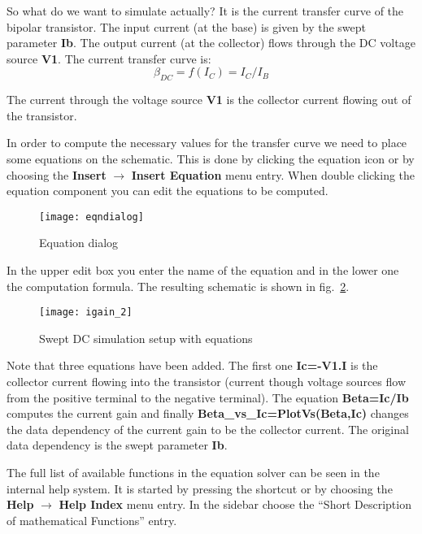 \medskip

So what do we want to simulate actually?  It is the current transfer
curve of the bipolar transistor.  The input current (at the base) is
given by the swept parameter \textbf{Ib}.  The output current (at the
collector) flows through the DC voltage source \textbf{V1}.  The
current transfer curve is:
\begin{equation*}
\beta_{DC} = f\left(I_C\right) = I_C / I_B
\end{equation*}

The current through the voltage source \textbf{V1} is the collector
current flowing out of the transistor.


In order to compute the necessary values for the transfer curve we
need to place some equations on the schematic.  This is done by
clicking the equation icon or by choosing the \textbf{Insert}
$\rightarrow$ \textbf{Insert Equation} menu entry.  When double
clicking the equation component you can edit the equations to be
computed.

\begin{figure}[ht]
  \centering
  \texttt{[image: eqndialog]}
  \caption{Equation dialog}
  \label{fig:eqndialog}
\end{figure}
\FloatBarrier

In the upper edit box you enter the name of the equation and in the
lower one the computation formula.  The resulting schematic is shown
in fig.~\ref{fig:igain_2}.

\begin{figure}[ht]
  \centering
  \texttt{[image: igain\_2]}
  \caption{Swept DC simulation setup with equations}
  \label{fig:igain_2}
\end{figure}
\FloatBarrier

Note that three equations have been added.  The first one
\textbf{Ic=-V1.I} is the collector current flowing into the transistor
(current though voltage sources flow from the positive terminal to the
negative terminal).  The equation \textbf{Beta=Ic/Ib} computes the
current gain and finally \textbf{Beta\_vs\_Ic=PlotVs(Beta,Ic)} changes
the data dependency of the current gain to be the collector current.
The original data dependency is the swept parameter \textbf{Ib}.


The full list of available functions in the equation solver can be
seen in the internal help system.  It is started by pressing the
 shortcut or by choosing the \textbf{Help} $\rightarrow$
\textbf{Help Index} menu entry.  In the sidebar choose the ``Short
Description of mathematical Functions'' entry.

